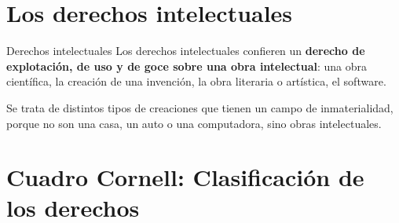 \documentclass[12pt,oneside]{book}
\begin{document}
\section{Los derechos intelectuales}

\begin{definition}{Derechos intelectuales}
Los derechos intelectuales confieren un \textbf{derecho de explotación, de uso y de goce sobre una obra intelectual}: una obra científica, la creación de una invención, la obra literaria o artística, el software.
\end{definition}

Se trata de distintos tipos de creaciones que tienen un campo de inmaterialidad, porque no son una casa, un auto o una computadora, sino obras intelectuales.

\section{Cuadro Cornell: Clasificación de los derechos}
\end{document}
